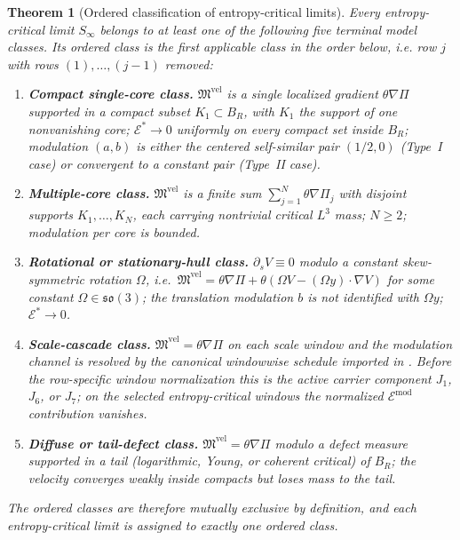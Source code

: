 \documentclass[11pt]{amsart}
\numberwithin{equation}{section}
\theoremstyle{plain}
\newtheorem{theorem}{Theorem}[section]
\theoremstyle{definition}
\theoremstyle{remark}
\newcommand{\Err}{\mathcal E}
\begin{document}
\begin{theorem}[Ordered classification of entropy-critical limits]
\label{thm:five-classes-ordered}
Every entropy-critical limit \(S_\infty\) belongs to at least one of the
following five terminal model classes.  Its \emph{ordered class} is the first
applicable class in the order below, i.e. row \(j\) with rows
\((1),\dots,(j-1)\) removed:
\begin{enumerate}[label=\textup{(\arabic*)},leftmargin=2.2em]
	\item \textbf{Compact single-core class.}
	\(\mathfrak M^{\mathrm{vel}}\) is a single localized gradient
	\(\theta\nabla\Pi\) supported in a compact subset \(K_1\subset B_R\), with
	\(K_1\) the support of one nonvanishing core; \(\Err^{*}\to0\)
	uniformly on every compact set inside \(B_R\); modulation \((a,b)\) is
	either the centered self-similar pair \((1/2,0)\) (Type~I case) or
	convergent to a constant pair (Type~II case).
	\item \textbf{Multiple-core class.}
	\(\mathfrak M^{\mathrm{vel}}\) is a finite sum
	\(\sum_{j=1}^N\theta\nabla\Pi_j\) with disjoint supports
	\(K_1,\dots,K_N\), each carrying nontrivial critical \(L^3\) mass;
	\(N\ge2\); modulation per core is bounded.
	\item \textbf{Rotational or stationary-hull class.}
	\(\partial_s V\equiv0\) modulo a constant skew-symmetric rotation
	\(\Omega\), i.e.\
	\(\mathfrak M^{\mathrm{vel}}
	=\theta\nabla\Pi+\theta(\Omega V-(\Omega y)\cdot\nabla V)\)
	for some constant \(\Omega\in\mathfrak{so}(3)\); the translation
	modulation \(b\) is not identified with \(\Omega y\); \(\Err^{*}\to0\).
	\item \textbf{Scale-cascade class.}
	\(\mathfrak M^{\mathrm{vel}}=\theta\nabla\Pi\) on each scale window
	and the modulation channel is resolved by the canonical windowwise schedule
	imported in \Cref{imp:typeii-terminal-closures}.  Before the row-specific
	window normalization this is the active carrier component \(J_1\), \(J_6\),
	or \(J_7\); on the selected entropy-critical windows the normalized
	\(\Err^{\mathrm{mod}}\) contribution vanishes.
	\item \textbf{Diffuse or tail-defect class.}
	\(\mathfrak M^{\mathrm{vel}}=\theta\nabla\Pi\) modulo a defect measure
	supported in a tail (logarithmic, Young, or coherent critical) of
	\(B_R\); the velocity converges weakly inside compacts but loses mass
	to the tail.
\end{enumerate}
The ordered classes are therefore mutually exclusive by definition, and each
entropy-critical limit is assigned to exactly one ordered class.
\end{theorem}
\end{document}
